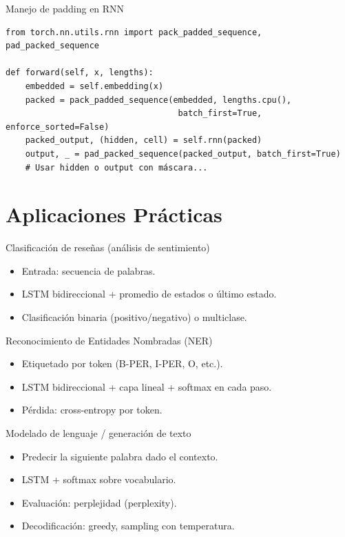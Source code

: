\documentclass[aspectratio=169, 10pt, xcolor=table]{beamer}
\begin{document}
\begin{frame}[fragile]{Manejo de padding en RNN}
    \begin{lstlisting}
from torch.nn.utils.rnn import pack_padded_sequence, pad_packed_sequence

def forward(self, x, lengths):
    embedded = self.embedding(x)
    packed = pack_padded_sequence(embedded, lengths.cpu(),
                                   batch_first=True, enforce_sorted=False)
    packed_output, (hidden, cell) = self.rnn(packed)
    output, _ = pad_packed_sequence(packed_output, batch_first=True)
    # Usar hidden o output con máscara...
    \end{lstlisting}
\end{frame}

\section{Aplicaciones Prácticas}

\begin{frame}{Clasificación de reseñas (análisis de sentimiento)}
    \begin{itemize}
        \item Entrada: secuencia de palabras.
        \item LSTM bidireccional + promedio de estados o último estado.
        \item Clasificación binaria (positivo/negativo) o multiclase.
    \end{itemize}
\end{frame}

\begin{frame}{Reconocimiento de Entidades Nombradas (NER)}
    \begin{itemize}
        \item Etiquetado por token (B-PER, I-PER, O, etc.).
        \item LSTM bidireccional + capa lineal + softmax en cada paso.
        \item Pérdida: cross-entropy por token.
    \end{itemize}
\end{frame}

\begin{frame}{Modelado de lenguaje / generación de texto}
    \begin{itemize}
        \item Predecir la siguiente palabra dado el contexto.
        \item LSTM + softmax sobre vocabulario.
        \item Evaluación: perplejidad (perplexity).
        \item Decodificación: greedy, sampling con temperatura.
    \end{itemize}
\end{frame}
\end{document}

